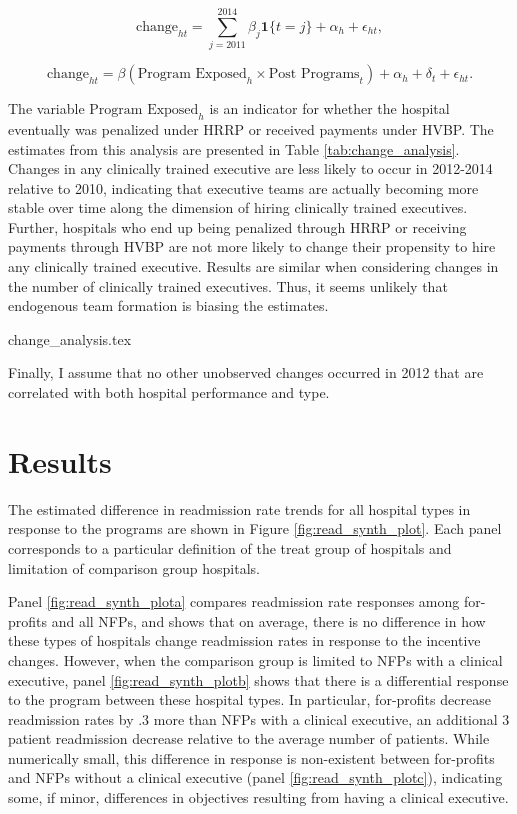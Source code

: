 \documentclass[12pt]{article}
\begin{document}
    \begin{equation}\label{eq:change1}
    \text{change}_{ht} = \sum_{j=2011}^{2014}\beta_j\mathbf{1}\{t=j\} + \alpha_h + \epsilon_{ht},
    \end{equation}

    \begin{equation}\label{eq:change2}
    \text{change}_{ht} = \beta(\text{Program Exposed}_{h} \times \text{Post Programs}_t)+ \alpha_h + \delta_t + \epsilon_{ht}.
    \end{equation}

    The variable $\text{Program Exposed}_{h}$ is an indicator for whether the hospital eventually was penalized under HRRP or received payments under HVBP. The estimates from this analysis are presented in Table \ref{tab:change_analysis}. Changes in any clinically trained executive are less likely to occur in 2012-2014 relative to 2010, indicating that executive teams are actually becoming more stable over time along the dimension of hiring clinically trained executives. Further, hospitals who end up being penalized through HRRP or receiving payments through HVBP are not more likely to change their propensity to hire any clinically trained executive. Results are similar when considering changes in the number of clinically trained executives. Thus, it seems unlikely that endogenous team formation is biasing the estimates.

     {change_analysis.tex}

    Finally, I assume that no other unobserved changes occurred in 2012 that are correlated with both hospital performance and type. 

    
    
    \section{Results}

     The estimated difference in readmission rate trends for all hospital types in response to the programs are shown in Figure \ref{fig:read_synth_plot}. Each panel corresponds to a particular definition of the treat group of hospitals and limitation of comparison group hospitals.
     
     Panel \ref{fig:read_synth_plota} compares readmission rate responses among for-profits and all NFPs, and shows that on average, there is no difference in how these types of hospitals change readmission rates in response to the incentive changes. However, when the comparison group is limited to NFPs with a clinical executive, panel \ref{fig:read_synth_plotb} shows that there is a differential response to the program between these hospital types. In particular, for-profits decrease readmission rates by .3 more than NFPs with a clinical executive, an additional 3 patient readmission decrease relative to the average number of patients. While numerically small, this difference in response is non-existent between for-profits and NFPs without a clinical executive (panel \ref{fig:read_synth_plotc}), indicating some, if minor, differences in objectives resulting from having a clinical executive. 
\end{document}
